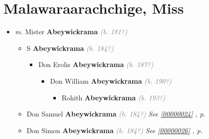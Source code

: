 \documentclass[10pt, openany]{book}
\begin{document}
\chapter{Malawaraarachchige, Miss}
\label{00000520}
\textcolor{slmaroon}{\textit{}}
\begin{itemize}
\item{\textit{m.} Mister \textbf{Abeywickrama} \textcolor{gray}{\textit{(b. 181?)}}   \label{couple:00000043:00000520} \begin{itemize}
\item{S \textbf{Abeywickrama} \textcolor{gray}{\textit{(b. 184?)}}
\begin{itemize}
\item{Don Erolis \textbf{Abeywickrama} \textcolor{gray}{\textit{(b. 187?)}}
\begin{itemize}
\item{Don William \textbf{Abeywickrama} \textcolor{gray}{\textit{(b. 190?)}}
\begin{itemize}
\item{Rohith \textbf{Abeywickrama} \textcolor{gray}{\textit{(b. 193?)}}
 }
\end{itemize}
  }
\end{itemize}
  }
\end{itemize}
 }
\item{Don Samuel \textbf{Abeywickrama} \textcolor{gray}{\textit{(b. 184?)}} \textcolor{slteal}{\textit{See  \autoref{00000024} \textit{, p. \pageref{00000024} }}}}
\item{Don Simon \textbf{Abeywickrama} \textcolor{gray}{\textit{(b. 184?)}} \textcolor{slteal}{\textit{See  \autoref{00000026} \textit{, p. \pageref{00000026} }}}}
\end{itemize}}
\end{itemize}
 
\end{document}
